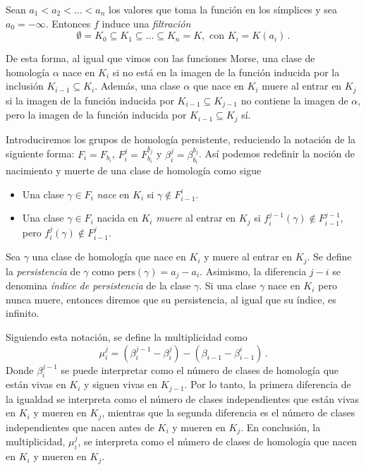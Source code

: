 \begin{definition}
Sean $a_1 < a_2 < ... < a_n$ los valores que toma la función en los símplices y sea $a_0 = -\infty$. Entonces $f$ induce una \emph{filtración}
\[
\emptyset = K_0 \subseteq K_1 \subseteq ... \subseteq K_n = K, \text{ con } K_i=K(a_i)\,.
\]
\end{definition}

De esta forma, al igual que vimos con las funciones Morse, una clase de homología $\alpha$ nace en $K_i$ si no está en la imagen de la función inducida por la inclusión $K_{i-1} \subseteq K_i$. Además, una clase $\alpha$ que nace en $K_i$ muere al entrar en $K_j$ si la imagen de la función inducida por $K_{i-1} \subseteq K_{j-1}$ no contiene la imagen de $\alpha$, pero la imagen de la función inducida por $K_{i-1} \subseteq K_j$ sí.

Introduciremos los grupos de homología persistente, reduciendo la notación de la siguiente forma: $F_i = F_{b_i}$, $F_{i}^{j}=F_{b_i}^{b_j}$ y $\beta_{i}^{j}=\beta_{b_i}^{b_j}$. Así podemos redefinir la noción de nacimiento y muerte de una clase de homología como sigue
\begin{itemize}
	\item Una clase $\gamma \in F_i$ \emph{nace} en $K_i$ si $\gamma \notin F_{i-1}^{i}$.
	\item Una clase $\gamma \in F_i$ nacida en $K_i$ \emph{muere} al entrar en $K_j$ si $f_{i}^{j-1}(\gamma)\notin F_{i-1}^{j-1}$, pero $f_{i}^{j}(\gamma)\notin F_{i-1}^{j}$. 
\end{itemize} 

\begin{definition}
Sea $\gamma$ una clase de homología que nace en $K_i$ y muere al entrar en $K_j$. Se define la \emph{persistencia} de $\gamma$ como $\text{pers}(\gamma)= a_j - a_i$. Asimismo, la diferencia $j-i$ se denomina \emph{índice de persistencia} de la clase $\gamma$. Si una clase $\gamma$ nace en $K_i$ pero nunca muere, entonces diremos que su persistencia, al igual que su índice, es infinito.
\end{definition}

Siguiendo esta notación, se define la multiplicidad como
\[
\mu_{i}^{j} = (\beta_{i}^{j-1}-\beta_{i}^{j})-(\beta_{i-1}-\beta_{i-1}^{i})\,.
\]
Donde $\beta_{i}^{j-1}$ se puede interpretar como el número de clases de homología que están vivas en $K_i$ y siguen vivas en $K_{j-1}$. Por lo tanto, la primera diferencia de la igualdad se interpreta como el número de clases independientes que están vivas en $K_i$ y mueren en $K_j$, mientras que la segunda diferencia es el número de clases independientes que nacen antes de $K_i$ y mueren en $K_j$. En conclusión, la multiplicidad, $\mu_{i}^{j}$, se interpreta como el número de clases de homología que nacen en $K_i$ y mueren en $K_j$.

